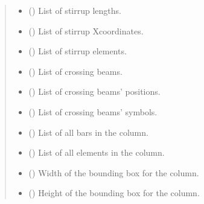 \documentclass[a4paper,10pt,english]{sphinxmanual}
\begin{document}
\begin{fulllineitems}
\begin{quote}
\begin{description}
\begin{itemize}
\item {} 
\sphinxAtStartPar
{} () \textendash{} List of stirrup lengths.

\item {} 
\sphinxAtStartPar
{} () \textendash{} List of stirrup X\sphinxhyphen{}coordinates.

\item {} 
\sphinxAtStartPar
{} () \textendash{} List of stirrup elements.

\item {} 
\sphinxAtStartPar
{} () \textendash{} List of crossing beams.

\item {} 
\sphinxAtStartPar
{} () \textendash{} List of crossing beams’ positions.

\item {} 
\sphinxAtStartPar
{} () \textendash{} List of crossing beams’ symbols.

\item {} 
\sphinxAtStartPar
{} () \textendash{} List of all bars in the column.

\item {} 
\sphinxAtStartPar
{} () \textendash{} List of all elements in the column.

\item {} 
\sphinxAtStartPar
{} () \textendash{} Width of the bounding box for the column.

\item {} 
\sphinxAtStartPar
{} () \textendash{} Height of the bounding box for the column.


\end{itemize}
\end{description}
\end{quote}
\end{fulllineitems}
\end{document}
